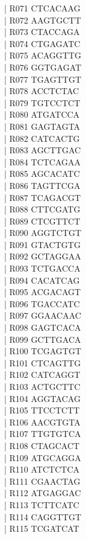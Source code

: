 \documentclass[titlepage,10pt,a4paper,uplatex]{jsbook}
\newenvironment{content}{\begin{shaded}\vspace{-1em}\raggedright\ttfamily\footnotesize\setlength{\baselineskip}{1.4em}}{\end{shaded}\vspace{-1em}}
\begin{document}
\begin{content}
| R071	CTCACAAG\\
| R072	AAGTGCTT\\
| R073	CTACCAGA\\
| R074	CTGAGATC\\
| R075	ACAGGTTG\\
| R076	GGTGAGAT\\
| R077	TGAGTTGT\\
| R078	ACCTCTAC\\
| R079	TGTCCTCT\\
| R080	ATGATCCA\\
| R081	GAGTAGTA\\
| R082	CATCACTG\\
| R083	AGCTTGAC\\
| R084	TCTCAGAA\\
| R085	AGCACATC\\
| R086	TAGTTCGA\\
| R087	TCAGACGT\\
| R088	CTTCGATG\\
| R089	CTCGTTCT\\
| R090	AGGTCTGT\\
| R091	GTACTGTG\\
| R092	GCTAGGAA\\
| R093	TCTGACCA\\
| R094	CACATCAG\\
| R095	ACGACAGT\\
| R096	TGACCATC\\
| R097	GGAACAAC\\
| R098	GAGTCACA\\
| R099	GCTTGACA\\
| R100	TCGAGTGT\\
| R101	CTCAGTTG\\
| R102	CATCAGGT\\
| R103	ACTGCTTC\\
| R104	AGGTACAG\\
| R105	TTCCTCTT\\
| R106	AACGTGTA\\
| R107	TTGTGTCA\\
| R108	CTAGCACT\\
| R109	ATGCAGGA\\
| R110	ATCTCTCA\\
| R111	CGAACTAG\\
| R112	ATGAGGAC\\
| R113	TCTTCATC\\
| R114	CAGGTTGT\\
| R115	TCGATCAT\\

\end{content}
\end{document}
